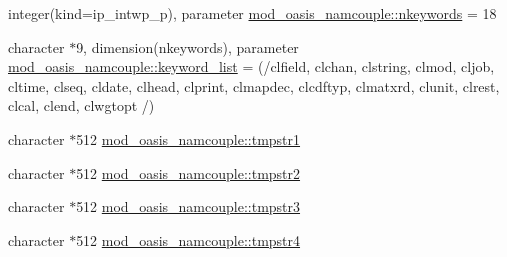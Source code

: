 \begin{DoxyCompactItemize}
\item 
integer(kind=ip\+\_\+intwp\+\_\+p), parameter \hyperlink{namespacemod__oasis__namcouple_ab629bd69885e9cd058f694b00474333a}{mod\+\_\+oasis\+\_\+namcouple\+::nkeywords} = 18
\item 
character $\ast$9, dimension(nkeywords), parameter \hyperlink{namespacemod__oasis__namcouple_acd9594862404b2bbd26a2ce069076b0e}{mod\+\_\+oasis\+\_\+namcouple\+::keyword\+\_\+list} = (/clfield, clchan, clstring, clmod, cljob, cltime, clseq, cldate, clhead, clprint, clmapdec, clcdftyp, clmatxrd, clunit, clrest, clcal, clend, clwgtopt /)
\item 
character $\ast$512 \hyperlink{namespacemod__oasis__namcouple_aca533555969c4dff9419daac8c70bbda}{mod\+\_\+oasis\+\_\+namcouple\+::tmpstr1}
\item 
character $\ast$512 \hyperlink{namespacemod__oasis__namcouple_a675d6fc398ff3a060fbd9949fde4d0e2}{mod\+\_\+oasis\+\_\+namcouple\+::tmpstr2}
\item 
character $\ast$512 \hyperlink{namespacemod__oasis__namcouple_a5564b823ced851e25d198f2c300dc138}{mod\+\_\+oasis\+\_\+namcouple\+::tmpstr3}
\item 
character $\ast$512 \hyperlink{namespacemod__oasis__namcouple_ada1acbaf7e666b7220e3b7fb8d0f2549}{mod\+\_\+oasis\+\_\+namcouple\+::tmpstr4}
\end{DoxyCompactItemize}
